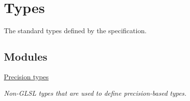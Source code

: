 \hypertarget{group__core__types}{}\section{Types}
\label{group__core__types}


The standard types defined by the specification.  


\subsection*{Modules}
\begin{DoxyCompactItemize}
\item 
\hyperlink{group__core__precision}{Precision types}
\begin{DoxyCompactList}\small\item\em Non-\/\+G\+L\+SL types that are used to define precision-\/based types. \end{DoxyCompactList}\end{DoxyCompactItemize}

